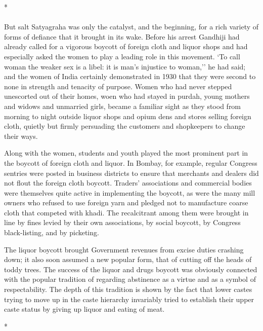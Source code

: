 \begin{multicols}{2}
\begin{center}*\end{center}

\paragraph*{}

But salt Satyagraha was only the catalyst, and the beginning, for a rich variety of forms of defiance that it brought in its wake. Before his arrest Gandhiji had already called for a vigorous boycott of foreign cloth and liquor shops and had especially asked the women to play a leading role in this movement. `To call woman the weaker sex is a libel: it is man's injustice to woman,'' he had said; and the women of India certainly demonstrated in 1930 that they were second to none in strength and tenacity of purpose. Women who had never stepped unescorted out of their homes, woen who had stayed in purdah, young mothers and widows and unmarried girls, became a familiar sight as they stood from morning to night outside liquor shops and opium dens and stores selling foreign cloth, quietly but firmly persuading the customers and shopkeepers to change their ways.

Along with the women, students and youth played the most prominent part in the boycott of foreign cloth and liquor. In Bombay, for example, regular Congress sentries were posted in business districts to ensure that merchants and dealers did not flout the foreign cloth boycott. Traders' associations and commercial bodies were themselves quite active in implementing the boycott, as were the many mill owners who refused to use foreign yarn and pledged not to manufacture coarse cloth that competed with khadi. The recalcitrant among them were brought in line by fines levied by their own associations, by social boycott, by Congress black-listing, and by picketing.

The liquor boycott brought Government revenues from excise duties crashing down; it also soon assumed a new popular form, that of cutting off the heads of toddy trees. The success of the liquor and drugs boycott was obviously connected with the popular tradition of regarding abstinence as a virtue and as a symbol of respectability. The depth of this tradition is shown by the fact that lower castes trying to move up in the caste hierarchy invariably tried to establish their upper caste status by giving up liquor and eating of meat.

\begin{center}*\end{center}


\end{multicols}
